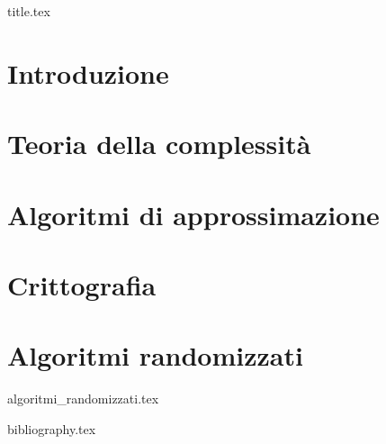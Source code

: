 \documentclass[a4paper,11pt,oneside]{book}
\begin{document}

\frontmatter

{title.tex}

\tableofcontents

\mainmatter


\chapter{Introduzione}

\chapter{Teoria della complessità}

\chapter{Algoritmi di approssimazione}

\chapter{Crittografia}

\chapter{Algoritmi randomizzati}
{algoritmi_randomizzati.tex}

\cleardoublepage

{bibliography.tex}
\end{document}
